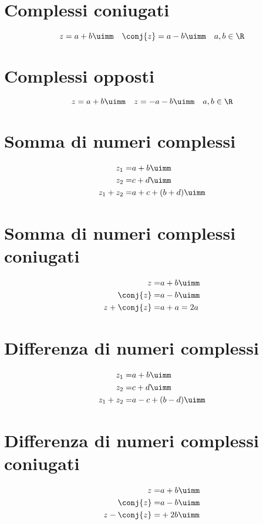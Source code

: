 \section{Complessi coniugati}
\begin{equation*}
z=a+b\uimm\quad\conj{z}=a-b\uimm\quad a,b\in\R
\end{equation*}
\section{Complessi opposti}
\begin{equation*}
z=a+b\uimm\quad\-z=-a-b\uimm\quad a,b\in\R
\end{equation*}
\section{Somma di numeri complessi}
\begin{align*}
z_1=&a+b\uimm\\
z_2=&c+d\uimm\\
z_1+z_2=&a+c+(b+d)\uimm
\end{align*}
\section{Somma di numeri complessi coniugati}
\begin{align*}
z=&a+b\uimm\\
\conj{z}=&a-b\uimm\\
z+\conj{z}=&a+a=2a
\end{align*}
\section{Differenza di numeri complessi}
\begin{align*}
z_1=&a+b\uimm\\
z_2=&c+d\uimm\\
z_1+z_2=&a-c+(b-d)\uimm
\end{align*}
\section{Differenza di numeri complessi coniugati}
\begin{align*}
z=&a+b\uimm\\
\conj{z}=&a-b\uimm\\
z-\conj{z}=&+2b\uimm
\end{align*}
